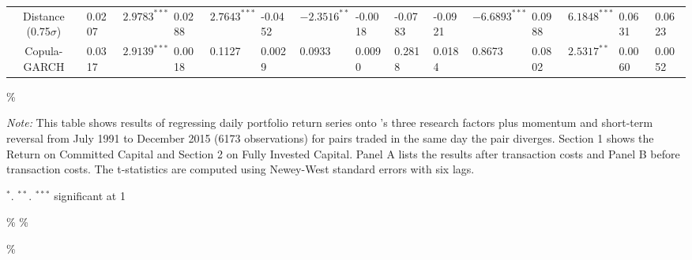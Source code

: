 \documentclass[a4paper]{article}
\begin{document}
\begin{sidewaystable}
\begin{threeparttable}[H]
\begin{tabularx}{\textwidth}{@{\extracolsep{\fill}}lllllllllllllll@{}}
				\multicolumn{1}{c}{Distance (0.75$\sigma$)} & 0.0207 & $2.9783^{***}$ & 0.0288 & $2.7643^{***}$ & -0.0452 & $-2.3516^{**}$ & -0.0018 & -0.0783 & -0.0921 & $-6.6893^{***}$ & 0.0988 & $6.1848^{***}$ & 0.0631 & 0.0623  \\
				\multicolumn{1}{c}{Copula-GARCH} & 0.0317 & $2.9139^{***}$ & 0.0018 & 0.1127 & 0.0029 & 0.0933 & 0.0090 & 0.2818 & 0.0184 & 0.8673 & 0.0802 & $2.5317^{**}$ & 0.0060 & 0.0052 \\
				\bottomrule
			\end{tabularx}\%
			\begin{tablenotes}
				\item \textit{Note:} \scriptsize  This table shows results of regressing daily portfolio return series onto \citet*{ff93}'s three research factors plus momentum and short-term reversal from July 1991 to December 2015 (6173 observations) for pairs traded in the same day the pair diverges. Section 1 shows the Return on Committed Capital and Section 2 on Fully Invested Capital. Panel A lists the results after transaction costs and Panel B before transaction costs. The t-statistics are computed using Newey-West standard errors with six lags.
				\item \scriptsize $^{\ast}$. $^{\ast\ast}$. $^{\ast\ast\ast}$  significant at 1\\%
			\end{tablenotes}
		\end{threeparttable}\%
		\label{tab:table112}\%
	\end{sidewaystable}\%
	
\end{document}
